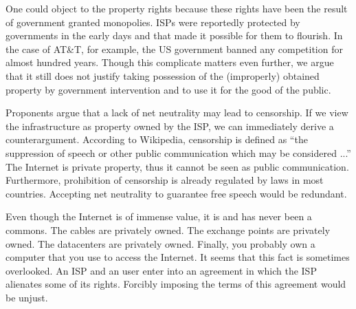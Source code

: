 One could object to the property rights because these rights have been the result of government granted monopolies. \acp{ISP} were reportedly protected by governments in the early days and that made it possible for them to flourish. In the case of AT\&T, for example, the US government banned any competition for almost hundred years. \cite{oa2014objectivists} Though this complicate matters even further, we argue that it still does not justify taking possession of the (improperly) obtained property by government intervention and to use it for the good of the public.

Proponents argue that a lack of net neutrality may lead to censorship. If we view the infrastructure as property owned by the \ac{ISP}, we can immediately derive a counterargument. According to Wikipedia, censorship is defined as ``the suppression of speech or other public communication which may be considered ...'' The Internet is private property, thus it cannot be seen as public communication. \cite{falkvinge2014agree} Furthermore, prohibition of censorship is already regulated by laws in most countries. Accepting net neutrality to guarantee free speech would be redundant.




Even though the Internet is of immense value, it is and has never been a commons. The cables are privately owned. The exchange points are privately owned. The datacenters are privately owned. Finally, you probably own a computer that you use to access the Internet. It seems that this fact is sometimes overlooked. An \ac{ISP} and an user enter into an agreement in which the \ac{ISP} alienates some of its rights. Forcibly imposing the terms of this agreement would be unjust. \cite{tech2014deon}